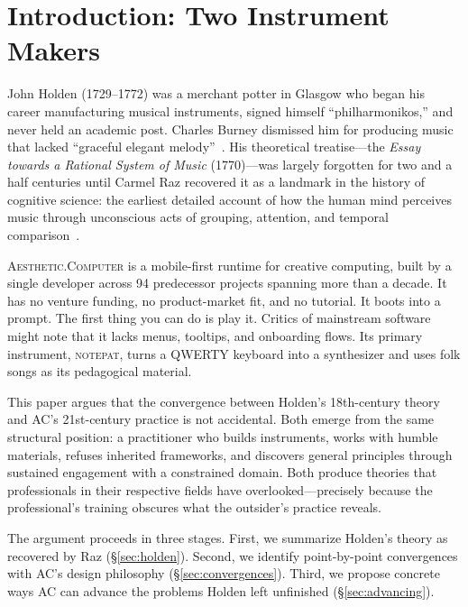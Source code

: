 \documentclass[10pt,letterpaper,twocolumn]{article}
\newcommand{\ac}{\textsc{Aesthetic.Computer}}
\newcommand{\np}{\textsc{notepat}}
\begin{document}
\section{Introduction: Two Instrument Makers}

John Holden (1729--1772) was a merchant potter in Glasgow who began his career manufacturing musical instruments, signed himself ``philharmonikos,'' and never held an academic post. Charles Burney dismissed him for producing music that lacked ``graceful elegant melody''~\citep{raz2025}. His theoretical treatise---the \emph{Essay towards a Rational System of Music} (1770)---was largely forgotten for two and a half centuries until Carmel Raz recovered it as a landmark in the history of cognitive science: the earliest detailed account of how the human mind perceives music through unconscious acts of grouping, attention, and temporal comparison~\citep{raz2025}.

\ac{} is a mobile-first runtime for creative computing, built by a single developer across 94 predecessor projects spanning more than a decade. It has no venture funding, no product-market fit, and no tutorial. It boots into a prompt. The first thing you can do is play it. Critics of mainstream software might note that it lacks menus, tooltips, and onboarding flows. Its primary instrument, \np{}, turns a QWERTY keyboard into a synthesizer and uses folk songs as its pedagogical material.

This paper argues that the convergence between Holden's 18th-century theory and AC's 21st-century practice is not accidental. Both emerge from the same structural position: a practitioner who builds instruments, works with humble materials, refuses inherited frameworks, and discovers general principles through sustained engagement with a constrained domain. Both produce theories that professionals in their respective fields have overlooked---precisely because the professional's training obscures what the outsider's practice reveals.

The argument proceeds in three stages. First, we summarize Holden's theory as recovered by Raz (\S\ref{sec:holden}). Second, we identify point-by-point convergences with AC's design philosophy (\S\ref{sec:convergences}). Third, we propose concrete ways AC can advance the problems Holden left unfinished (\S\ref{sec:advancing}).

\end{document}
